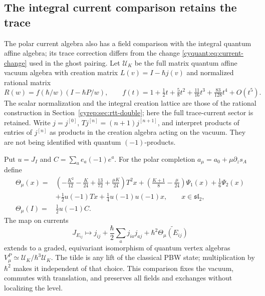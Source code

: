 \subsection{The integral current comparison retains the trace}

The polar current algebra also has a field comparison with the integral
quantum affine algebra; its trace correction differs from the change
\eqref{cyquant:eq:current-change} used in the ghost pairing.
Let $\mathcal U_K$ be the full matrix quantum affine vacuum algebra
with creation matrix $L(v)=I-\hbar j(v)$ and normalized rational
matrix
\[
 R(w)=f(\hbar/w)(I-\hbar P/w),\qquad
 f(t)=1+\tfrac12t+\tfrac58t^2+\tfrac{11}{16}t^3
                         +\tfrac{83}{128}t^4+O(t^5).
\]
The scalar normalization and the integral creation lattice are those
of the rational construction in Section~\ref{cyrep:sec:rtt-double};
here the full trace-current sector is retained.  Write $j=j^{[0]}$,
$Tj^{[n]}=(n+1)j^{[n+1]}$, and interpret products of entries of
$j^{[n]}$ as products in the creation algebra acting on the vacuum.
They are not being identified with quantum $(-1)$-products.

Put $u=J_I$ and $C=\sum_a e_a(-1)e^a$.
For the polar completion $a_\mu=a_0+\mu\partial_zs_A$ define
\[
 \begin{aligned}
 \Theta_\mu(x)={}&
 \left(-\frac{K^2}{12}-\frac K{24}+\frac{13}{72}
                         +\frac{\mu K}{24}\right)T^2x
 +\left(\frac{K+1}{8}-\frac\mu{24}\right)\Psi_1(x)
 +\frac16\Psi_2(x)\\
 &+\frac12u(-1)Tx+\frac14u(-1)u(-1)x,
       \qquad x\in\mathfrak{sl}_2,\\
 \Theta_\mu(I)={}&\frac12u(-1)C.
 \end{aligned}
\]
The map on currents
\begin{equation}\label{cyquant:eq:integral-current-map}
 J_{E_{ij}}\longmapsto
 j_{ij}+\frac\hbar2\sum_a j_{ia}j_{aj}
                   +\hbar^2\widetilde{\Theta_\mu(E_{ij})}
\end{equation}
extends to a graded, equivariant isomorphism of quantum vertex
algebras $V^P_\mu\simeq\mathcal U_K/\hbar^3\mathcal U_K$.
The tilde is any lift of the classical PBW state; multiplication by
$\hbar^2$ makes it independent of that choice.  This comparison
fixes the vacuum, commutes with translation, and preserves all fields
and exchanges without localizing the level.

